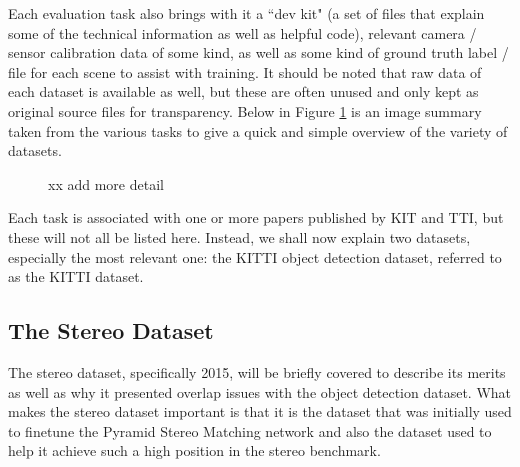 Each evaluation task also brings with it a ``dev kit" (a set of files that explain some of the technical information as well as helpful code), relevant camera / sensor calibration data of some kind, as well as some kind of ground truth label / file for each scene to assist with training. It should be noted that raw data of each dataset is available as well, but these are often unused and only kept as original source files for transparency. Below in Figure \ref{kitti_samples} is an image summary taken from the various tasks to give a quick and simple overview of the variety of datasets.

\begin{figure}[ht]
    \centering
    \caption{xx add more detail}
    \label{kitti_samples}
\end{figure}

Each task is associated with one or more papers published by KIT and TTI, but these will not all be listed here. Instead, we shall now explain two datasets, especially the most relevant one: the KITTI object detection dataset, referred to as the KITTI dataset.

\subsection{The Stereo Dataset}
The stereo dataset, specifically 2015, will be briefly covered to describe its merits as well as why it presented overlap issues with the object detection dataset. What makes the stereo dataset important is that it is the dataset that was initially used to finetune the Pyramid Stereo Matching network and also the dataset used to help it achieve such a high position in the stereo benchmark.

